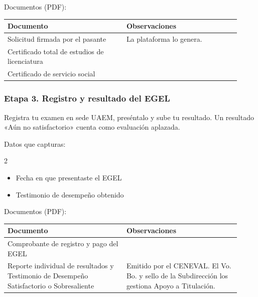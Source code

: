 Documentos (PDF):
{\small\begin{longtable}{>{\raggedright\arraybackslash}p{0.47\linewidth}>{\raggedright\arraybackslash}p{0.45\linewidth}}
\toprule
\textbf{Documento} & \textbf{Observaciones}\\
\midrule
\endhead
Solicitud firmada por el pasante & La plataforma lo genera.\\
Certificado total de estudios de licenciatura & \\
Certificado de servicio social & \\
\bottomrule
\end{longtable}}
\subsubsection*{Etapa 3. Registro y resultado del EGEL}
Registra tu examen en sede UAEM, preséntalo y sube tu resultado. Un resultado «Aún no satisfactorio» cuenta como evaluación aplazada.

Datos que capturas:
\begin{multicols}{2}\small
\begin{itemize}
  \item Fecha en que presentaste el EGEL
  \item Testimonio de desempeño obtenido
\end{itemize}
\end{multicols}

Documentos (PDF):
{\small\begin{longtable}{>{\raggedright\arraybackslash}p{0.47\linewidth}>{\raggedright\arraybackslash}p{0.45\linewidth}}
\toprule
\textbf{Documento} & \textbf{Observaciones}\\
\midrule
\endhead
Comprobante de registro y pago del EGEL & \\
Reporte individual de resultados y Testimonio de Desempeño Satisfactorio o Sobresaliente & Emitido por el CENEVAL. El Vo. Bo. y sello de la Subdirección los gestiona Apoyo a Titulación.\\
\bottomrule
\end{longtable}}
